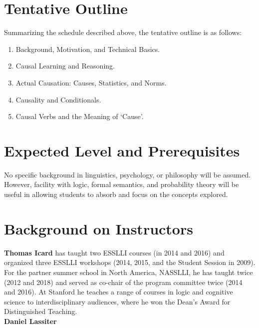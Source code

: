 \documentclass[english]{article}
\begin{document}

\section*{\large{Tentative Outline}}

Summarizing the schedule described above, the tentative outline is as follows:

\normalsize{
\begin{enumerate}
  \item Background, Motivation, and Technical Basics.
  \item Causal Learning and Reasoning.
  \item Actual Causation: Causes, Statistics, and Norms.
  \item Causality and Conditionals.
  \item Causal Verbs and the Meaning of `Cause'.
\end{enumerate}
}

\section*{\large{Expected Level and Prerequisites}}
No specific background in linguistics, psychology, or philosophy will be assumed. However, facility with logic, formal semantics, and probability theory will be useful in allowing students to absorb and focus on the concepts explored. 


\section*{\large{Background on Instructors}}

\textbf{Thomas Icard} has taught two ESSLLI courses (in 2014 and 2016) and organized three ESSLLI workshops (2014, 2015, and the Student Session in 2009). For the partner summer school in North America, NASSLLI, he has taught twice (2012 and 2018) and served as co-chair of the program committee twice (2014 and 2016). At Stanford he teaches a range of courses in logic and cognitive science to interdisciplinary audiences, where he won the Dean's Award for Distinguished Teaching. \\

\noindent \textbf{Daniel Lassiter} 



 
\end{document}
